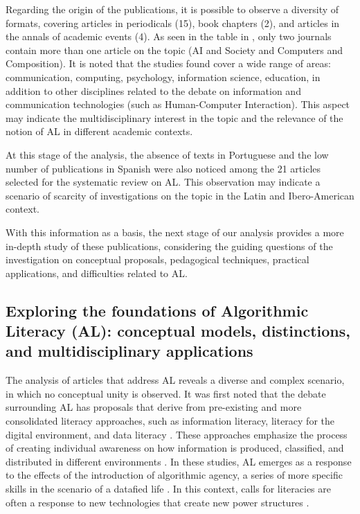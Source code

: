 Regarding the origin of the publications, it is possible to observe a diversity of formats, covering articles in periodicals (15), book chapters (2), and articles in the annals of academic events (4). As seen in the table in , only two journals contain more than one article on the topic (AI and Society and Computers and Composition). It is noted that the studies found cover a wide range of areas: communication, computing, psychology, information science, education, in addition to other disciplines related to the debate on information and communication technologies (such as Human-Computer Interaction). This aspect may indicate the multidisciplinary interest in the topic and the relevance of the notion of AL in different academic contexts.

At this stage of the analysis, the absence of texts in Portuguese and the low number of publications in Spanish were also noticed among the 21 articles selected for the systematic review on AL. This observation may indicate a scenario of scarcity of investigations on the topic in the Latin and Ibero-American context.

With this information as a basis, the next stage of our analysis provides a more in-depth study of these publications, considering the guiding questions of the investigation on conceptual proposals, pedagogical techniques, practical applications, and difficulties related to AL.

\subsection{Exploring the foundations of Algorithmic Literacy (AL): conceptual models, distinctions, and multidisciplinary applications}

The analysis of articles that address AL reveals a diverse and complex scenario, in which no conceptual unity is observed. It was first noted that the debate surrounding AL has proposals that derive from pre-existing and more consolidated literacy approaches, such as information literacy, literacy for the digital environment, and data literacy \cite{Lloyd2019}. These approaches emphasize the process of creating individual awareness on how information is produced, classified, and distributed in different environments \cite{Bakke2020}. In these studies, AL emerges as a response to the effects of the introduction of algorithmic agency, a series of more specific skills in the scenario of a datafied life \cite{Kampa2021}. In this context, calls for literacies are often a response to new technologies that create new power structures \cite{Devito2021}.

